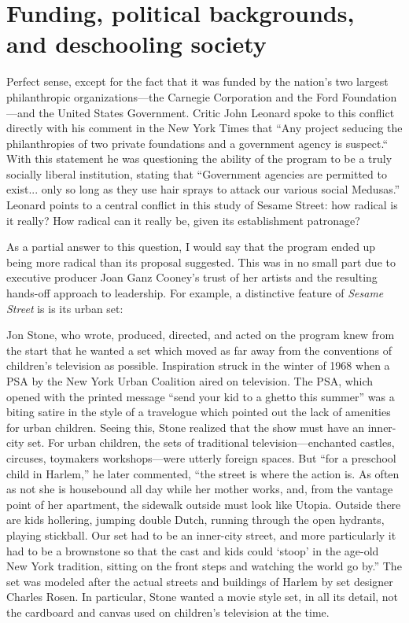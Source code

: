 \documentclass[12pt,letterpaper]{article}
\newcommand{\ses}{\textit{Sesame Street }}
\begin{document}
	\section*{Funding, political backgrounds, and deschooling society}

	Perfect sense, except for the fact that it was funded by the nation’s 
	two largest philanthropic organizations—the Carnegie Corporation and 
	the Ford Foundation—and the United States Government. Critic John 
	Leonard spoke to this conflict directly with his comment in the New 
	York Times that ``Any project seducing the philanthropies of two private
	foundations and a government agency is suspect.``
	With this statement he was questioning the ability of the program to be
	a truly socially liberal institution, stating that ``Government agencies
	are permitted to exist... only so long as they use hair sprays to 
	attack our various social Medusas.'' \autocite[146]{Davis} Leonard 
	points to a central conflict in this study of Sesame Street: how radical
	is it really? How radical can it really be, given its establishment 
	patronage?

	As a partial answer to this question, I would say that the program ended
	up being more radical than its proposal suggested. This was in no small 
	part due to executive producer Joan Ganz Cooney’s trust of her artists 
	and 
	the resulting hands-off approach to leadership.\autocite[155]{Davis} For
	example, a distinctive feature of \ses is is its urban set:

	Jon Stone, who wrote, produced, directed, and acted on the program knew
	from the start that he wanted a set which moved as far away from the 	
	conventions of children's television as possible.  
	Inspiration struck in the winter of 1968 when a PSA by the New York 
	Urban Coalition aired on television. The PSA, which opened with the
	printed message ``send your kid to a ghetto this summer''  was a biting
	satire in the style of a travelogue which pointed out the lack of 
	amenities for urban children. Seeing this, Stone realized that the show
	must have an inner-city set. For urban children, the sets of traditional
	television---enchanted castles, circuses, toymakers workshops---were
	utterly foreign spaces. But ``for a preschool child
	in Harlem,'' he later commented, ``the street is where the action is. As
	often as not she is housebound all day while her mother works, and, from	the vantage point of her apartment, the sidewalk outside must look like
	Utopia. Outside there are kids hollering, jumping double Dutch, running
	through the open hydrants, playing stickball. Our set had to be an 
	inner-city street, and more particularly it had to be a brownstone so 
	that the cast and kids could `stoop' in the age-old New York tradition,
	sitting on the front steps and watching the world go by.'' The set was 
	modeled after the actual streets and buildings of Harlem by set designer
	Charles Rosen. In particular, Stone wanted a movie style set, in all its
	detail, not the cardboard and canvas used on children's television at 
	the time.\autocite[154]{Davis}
\end{document}
